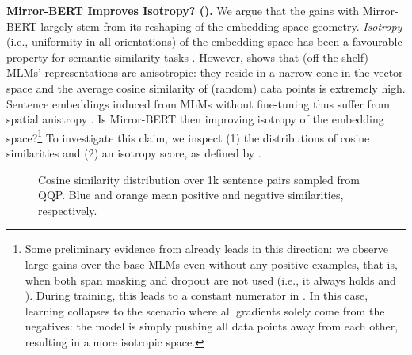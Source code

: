 \documentclass[11pt]{article}
\begin{document}
\vspace{1.2mm}
\noindent \textbf{Mirror-BERT Improves Isotropy? ().} We argue that the gains with Mirror-BERT largely stem from its reshaping of the embedding space geometry. \textit{Isotropy} (i.e., uniformity in all orientations) of the embedding space has been a favourable property for semantic similarity tasks \citep{arora2016latent,mu2017all}. However, \citet{ethayarajh2019contextual} shows that (off-the-shelf) MLMs' representations are anisotropic: they reside in a narrow cone in the vector space and the average cosine similarity of (random) data points is extremely high. Sentence embeddings induced from MLMs without fine-tuning thus suffer from spatial anistropy \citep{li-etal-2020-sentence,su2021whitening}. Is Mirror-BERT then improving isotropy of the embedding space?\footnote{Some preliminary evidence from  already leads in this direction: we observe large gains over the base MLMs even without any positive examples, that is, when both span masking and dropout are not used (i.e., it always holds  and ). During training, this leads to a constant numerator in . In this case, learning collapses to the scenario where all gradients solely come from the negatives: the model is simply pushing all data points away from each other, resulting in a more isotropic space.} To investigate this claim, we inspect (1) the distributions of cosine similarities and (2) an isotropy score, as defined by \citet{mu2017all}. 






\begin{figure}[!t]
 \centering
 \hfill
  \vspace{-1mm}
\caption{Cosine similarity distribution over 1k sentence pairs sampled from QQP. {\color{plot_blue}Blue} and {\color{plot_orange}orange} mean positive and negative similarities, respectively.}
\label{fig:cosine_distribution}
\vspace{-1.0mm}
\end{figure} 
\end{document}
